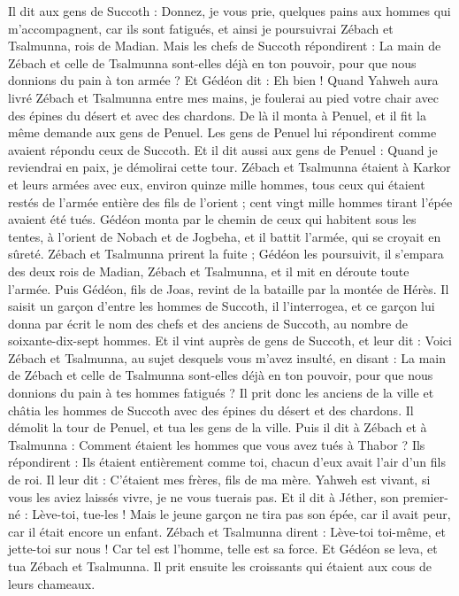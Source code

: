 \begin{multicols}{2}
Il dit aux gens de Succoth : Donnez, je vous prie, quelques pains aux hommes qui m’accompagnent, car ils sont fatigués, et ainsi je poursuivrai Zébach et Tsalmunna, rois de Madian.
Mais les chefs de Succoth répondirent : La main de Zébach et celle de Tsalmunna sont-elles déjà en ton pouvoir, pour que nous donnions du pain à ton armée ?
Et Gédéon dit : Eh bien ! Quand Yahweh aura livré Zébach et Tsalmunna entre mes mains, je foulerai au pied votre chair avec des épines du désert et avec des chardons.
De là il monta à Penuel, et il fit la même demande aux gens de Penuel. Les gens de Penuel lui répondirent comme avaient répondu ceux de Succoth.
Et il dit aussi aux gens de Penuel : Quand je reviendrai en paix, je démolirai cette tour.
Zébach et Tsalmunna étaient à Karkor et leurs armées avec eux, environ quinze mille hommes, tous ceux qui étaient restés de l'armée entière des fils de l’orient ; cent vingt mille hommes tirant l’épée avaient été tués.
Gédéon monta par le chemin de ceux qui habitent sous les tentes, à l’orient de Nobach et de Jogbeha, et il battit l'armée, qui se croyait en sûreté.
Zébach et Tsalmunna prirent la fuite ; Gédéon les poursuivit, il s’empara des deux rois de Madian, Zébach et Tsalmunna, et il mit en déroute toute l'armée.
Puis Gédéon, fils de Joas, revint de la bataille par la montée de Hérès.
Il saisit un garçon d’entre les hommes de Succoth, il l'interrogea, et ce garçon lui donna par écrit le nom des chefs et des anciens de Succoth, au nombre de soixante-dix-sept hommes.
Et il vint auprès de gens de Succoth, et leur dit : Voici Zébach et Tsalmunna, au sujet desquels vous m'avez insulté, en disant : La main de Zébach et celle de Tsalmunna sont-elles déjà en ton pouvoir, pour que nous donnions du pain à tes hommes fatigués ?
Il prit donc les anciens de la ville et châtia les hommes de Succoth avec des épines du désert et des chardons.
Il démolit la tour de Penuel, et tua les gens de la ville.
Puis il dit à Zébach et à Tsalmunna : Comment étaient les hommes que vous avez tués à Thabor ? Ils répondirent : Ils étaient entièrement comme toi, chacun d'eux avait l'air d'un fils de roi.
Il leur dit : C'étaient mes frères, fils de ma mère. Yahweh est vivant, si vous les aviez laissés vivre, je ne vous tuerais pas.
Et il dit à Jéther, son premier-né : Lève-toi, tue-les ! Mais le jeune garçon ne tira pas son épée, car il avait peur, car il était encore un enfant.
Zébach et Tsalmunna dirent : Lève-toi toi-même, et jette-toi sur nous ! Car tel est l'homme, telle est sa force. Et Gédéon se leva, et tua Zébach et Tsalmunna. Il prit ensuite les croissants qui étaient aux cous de leurs chameaux.

\end{multicols}
